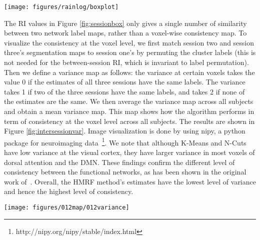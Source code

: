\documentclass[review,authoryear]{elsarticle}
\begin{document}
\begin{figure*}[htb]
  \centering
  \texttt{[image: figures/rainlog/boxplot]}
  \caption{Box-and-whiskers plots of the RI value between each pair of
    sessions over the all subjects' label map. The bottom and top of the boxes are
    the $25$th and $75$th percentile, and the whiskers extend to the whole
    range of the data except the outliers.}
  \label{fig:sessionbox}
\end{figure*}

The RI values in Figure \ref{fig:sessionbox} only gives a single number of
similarity between two network label maps, rather than a voxel-wise consistency
map. To visualize the consistency at the voxel level, we first match session two
and session three's segmentation maps to session one's by permuting the cluster
labels (this is not needed for the between-session RI, which is invariant to
label permutation).  Then we define a variance map as follows: the variance at
certain voxels takes the value 0 if the estimates of all three sessions have the
same labels. The variance takes 1 if two of the three sessions have the same
labels, and takes 2 if none of the estimates are the same. We then average the
variance map across all subjects and obtain a mean variance map. This map shows
how the algorithm performs in term of consistency at the voxel level across all
subjects. The results are shown in Figure \ref{fig:intersessionvar}.  Image
visualization is done by using nipy, a python package for neuroimaging
data~\footnote{http://nipy.org/nipy/stable/index.html}. We note that
although K-Means and N-Cuts have low variance at the visual cortex, they have
larger variance in most voxels of dorsal attention and the DMN. These findings
confirm the different level of consistency between the functional networks, as
has been shown in the original work of~\citet{zuo2010reliable}. Overall, the
HMRF method's estimates have the lowest level of variance and hence the highest
level of consistency.

\begin{figure*}[htb]
  \centering
  \texttt{[image: figures/012map/012variance]}
  \caption{The intersession variance maps estimated by four methods. ICA-7 and
    ICA-25 denote ICA with 7 and 25 components, respectively. The variance maps
    are obtained for each subject, averaged across subjects, and finally
    normalized to [0, 1]. A few voxels with intensity above 0.8 are rendered the
    same as those with intensity 0.8. This single map covers all seven
    functional networks, and we selectively show the slices corresponding to the
    three major networks. The images left are the subjects' left, and we use the
    same convention in the following figures. }
  \label{fig:intersessionvar}
\end{figure*}
\end{document}
